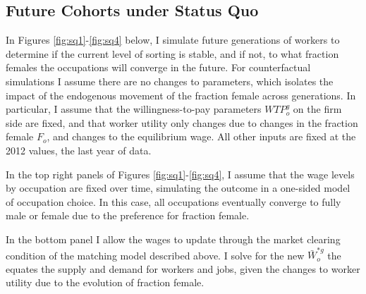 \documentclass[12pt]{article}
\begin{document}
\subsection{Future Cohorts under Status Quo}


In Figures \ref{fig:sq1}-\ref{fig:sq4} below, I simulate future generations of workers to determine if the current level of sorting is stable, and if not, to what fraction females the occupations will converge in the future. For counterfactual simulations I assume there are no changes to parameters, which isolates the impact of the endogenous movement of the fraction female across generations. In particular, I assume that the willingness-to-pay parameters $WTP^g_o$ on the firm side are fixed, and that worker utility only changes due to changes in the fraction female $F_o$, and changes to the equilibrium wage. All other inputs are fixed at the 2012 values, the last year of data. 




In the top right panels of Figures \ref{fig:sq1}-\ref{fig:sq4}, I assume that the wage levels by occupation are fixed over time, simulating the outcome in a one-sided model of occupation choice. In this case, all occupations eventually converge to fully male or female due to the preference for fraction female.



In the bottom panel I allow the wages to update through the market clearing condition of the matching model described above. I solve for the new $ \bar{W}^{*g}_o$ the equates the supply and demand for workers and jobs, given the changes to worker utility due to the evolution of fraction female. 


\end{document}
